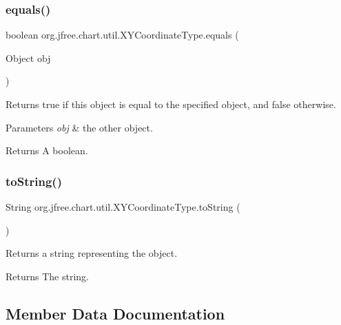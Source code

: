 \subsubsection{\texorpdfstring{equals()}{equals()}}
{\footnotesize\ttfamily boolean org.\+jfree.\+chart.\+util.\+X\+Y\+Coordinate\+Type.\+equals (\begin{DoxyParamCaption}\item[{Object}]{obj }\end{DoxyParamCaption})}

Returns {\ttfamily true} if this object is equal to the specified object, and {\ttfamily false} otherwise.


\begin{DoxyParams}{Parameters}
{\em obj} & the other object.\\
\hline
\end{DoxyParams}
\begin{DoxyReturn}{Returns}
A boolean. 
\end{DoxyReturn}
\mbox{\label{classorg_1_1jfree_1_1chart_1_1util_1_1_x_y_coordinate_type_a2a6cecbb4da150439540f37919cd2988}} 
\subsubsection{\texorpdfstring{to\+String()}{toString()}}
{\footnotesize\ttfamily String org.\+jfree.\+chart.\+util.\+X\+Y\+Coordinate\+Type.\+to\+String (\begin{DoxyParamCaption}{ }\end{DoxyParamCaption})}

Returns a string representing the object.

\begin{DoxyReturn}{Returns}
The string. 
\end{DoxyReturn}


\subsection{Member Data Documentation}
\mbox{\label{classorg_1_1jfree_1_1chart_1_1util_1_1_x_y_coordinate_type_a2048a71fe1acd8c8ad036609ee48b2ae}} 
